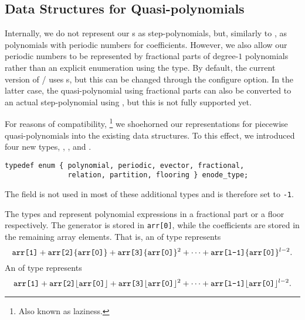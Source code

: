 \subsection{Data Structures for Quasi-polynomials}
\label{a:data}

Internally, we do not represent our s
as step-polynomials, but, similarly to ,
as polynomials with periodic numbers for coefficients.
However, we also allow our periodic numbers to be represented by
fractional parts of degree-$1$ polynomials rather than
an explicit enumeration using the  type.
By default, the current version of \barvinok/ uses
s, but this can be changed through
the  configure option.
In the latter case, the quasi-polynomial using fractional
parts can also be converted to an actual step-polynomial
using , but this is not fully
supported yet.

For reasons of compatibility,%
\footnote{Also known as laziness.}
we shoehorned our representations for piecewise quasi-polynomials
into the existing data structures.
To this effect, we introduced four new types,
, ,
 and .
\begin{verbatim}
typedef enum { polynomial, periodic, evector, fractional,
               relation, partition, flooring } enode_type;
\end{verbatim}
The field  is not used in most of these
additional types and is therefore set to \verb+-1+.

The types  and 
represent polynomial expressions in a fractional part or a floor respectively.
The generator is stored in \verb+arr[0]+, while the
coefficients are stored in the remaining array elements.
That is, an  of type 
represents
$$
\verb+arr[1]+ + \verb+arr[2]+ \{\verb+arr[0]+\} + 
\verb+arr[3]+ \{\verb+arr[0]+\}^2 + \cdots +
\verb+arr[l-1]+ \{\verb+arr[0]+\}^{l-2}
.
$$
An  of type 
represents
$$
\verb+arr[1]+ + \verb+arr[2]+ \lfloor\verb+arr[0]+\rfloor + 
\verb+arr[3]+ \lfloor\verb+arr[0]+\rfloor^2 + \cdots +
\verb+arr[l-1]+ \lfloor\verb+arr[0]+\rfloor^{l-2}
.
$$

